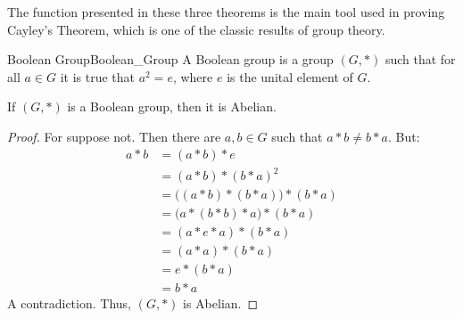     The function presented in these three theorems is the main tool used in
    proving Cayley's Theorem, which is one of the
    classic results of group theory.
    \begin{fdefinition}{Boolean Group}{Boolean_Group}
        A Boolean group is a group $(G,*)$ such that for all $a\in{G}$ it is
        true that $a^{2}=e$, where $e$ is the unital element of $G$.
    \end{fdefinition}
    \begin{theorem}
        If $(G,*)$ is a Boolean group, then it is Abelian.
    \end{theorem}
    \begin{proof}
        For suppose not. Then there are $a,b\in{G}$ such that $a*b\ne{b}*a$. But:
        \begin{align}
            a*b&=
            (a*b)*e
            \tag{Identity}\\
            &=(a*b)*(b*a)^{2}
            \tag{Boolean Property}\\
            &=\big((a*b)*(b*a)\big)*(b*a)
            \tag{Associativity}\\
            &=\big(a*(b*b)*a\big)*(b*a)
            \tag{Associativity}\\
            &=(a*e*a)*(b*a)
            \tag{Boolean Property}\\
            &=(a*a)*(b*a)
            \tag{Identity}\\
            &=e*(b*a)
            \tag{Boolean Property}\\
            &=b*a
            \tag{Identity}
        \end{align}
        A contradiction. Thus, $(G,*)$ is Abelian.
    \end{proof}

